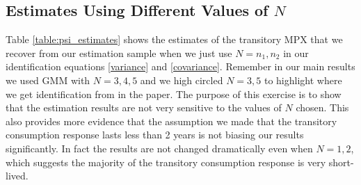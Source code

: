 \documentclass[titlepage]{\econtex}\newcommand{\texname}{ConsumptionHeterogeneity}
\begin{document}
\subsection{Estimates Using Different Values of $N$}
\begin{center}
	\label{table:psi_estimates}
	
\end{center}
Table \ref{table:psi_estimates} shows the estimates of the transitory MPX that we recover from our estimation sample when we just use $N=n_1,n_2$ in our identification equations \ref{variance} and \ref{covariance}. Remember in our main results we used GMM with $N=3,4,5$ and we high circled $N=3,5$ to highlight where we get identification from in the paper. The purpose of this exercise is to show that the estimation results are not very sensitive to the values of $N$ chosen. This also provides more evidence that the assumption we made that the transitory consumption response lasts less than 2 years is not biasing our results significantly. In fact the results are not changed dramatically even when $N=1,2$, which suggests the majority of the transitory consumption response is very short-lived.
\end{document}

